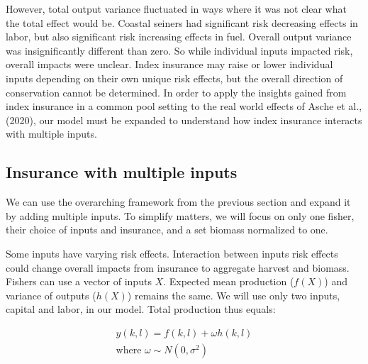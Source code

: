 \documentclass[
  super,
  preprint,
  3p]{elsarticle}
\theoremstyle{plain}
\theoremstyle{plain}
\theoremstyle{remark}
\begin{document}
However, total output variance fluctuated in ways where it was not clear
what the total effect would be. Coastal seiners had significant risk
decreasing effects in labor, but also significant risk increasing
effects in fuel. Overall output variance was insignificantly different
than zero. So while individual inputs impacted risk, overall impacts
were unclear. Index insurance may raise or lower individual inputs
depending on their own unique risk effects, but the overall direction of
conservation cannot be determined. In order to apply the insights gained
from index insurance in a common pool setting to the real world effects
of Asche et al., (2020), our model must be expanded to understand how
index insurance interacts with multiple inputs.

\hypertarget{sec-multi}{%
\subsection{Insurance with multiple inputs}\label{sec-multi}}

We can use the overarching framework from the previous section and
expand it by adding multiple inputs. To simplify matters, we will focus
on only one fisher, their choice of inputs and insurance, and a set
biomass normalized to one.

Some inputs have varying risk effects. Interaction between inputs risk
effects could change overall impacts from insurance to aggregate harvest
and biomass. Fishers can use a vector of inputs \(X\). Expected mean
production (\(f(X)\)) and variance of outputs (\(h(X)\)) remains the
same. We will use only two inputs, capital and labor, in our model.
Total production thus equals:

\[
\begin{aligned}
y(k,l)=f(k,l)+\omega h(k,l)\\
\text{where }\omega \sim N(0,\sigma^2)
\end{aligned}
\]
\end{document}
